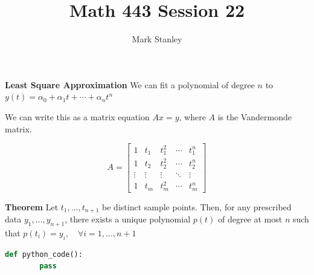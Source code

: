 \documentclass[11pt]{article}
\author{Mark Stanley}
\title{Math 443 Session 22}
\begin{document}
    \lstset{style=mystyle}

    \maketitle

    \textbf{Least Square Approximation}
    We can fit a polynomial of degree $n$ to $y(t)=\alpha_0 + \alpha_1 t + \cdots + \alpha_{n} t^n$

    We can write this as a matrix equation $Ax=y$, where $A$ is the Vandermonde matrix.

    \[A=\begin{bmatrix}
            1 & t_1 & t_1^2 & \cdots & t_1^n \\
            1 & t_2 & t_2^2 & \cdots & t_2^n \\
            \vdots & \vdots & \vdots & \ddots & \vdots \\
            1 & t_m & t_m^2 & \cdots & t_m^n
        \end{bmatrix}\]

    \textbf{Theorem}
    Let $t_1, \ldots, t_{n+1}$ be distinct sample points. Then, for any prescribed data $y_1, \ldots, y_{n+1}$, there
    exists a unique polynomial $p(t)$ of degree at most $n$ such that $p(t_i)=y_i, \quad \forall i=1, \ldots, n+1$


    \begin{lstlisting}[language=Python]
    def python_code():
        pass
    \end{lstlisting}
\end{document}
